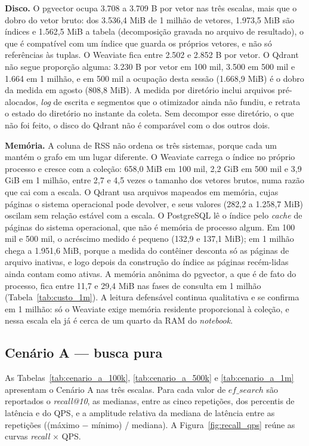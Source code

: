\textbf{Disco.} O pgvector ocupa 3.708 a 3.709 B por vetor nas três escalas, mais que o dobro do vetor bruto: dos 3.536,4 MiB de 1 milhão de vetores, 1.973,5 MiB são índices e 1.562,5 MiB a tabela (decomposição gravada no arquivo de resultado), o que é compatível com um índice que guarda os próprios vetores, e não só referências às tuplas. O Weaviate fica entre 2.502 e 2.852 B por vetor. O Qdrant não segue proporção alguma: 3.230 B por vetor em 100 mil, 3.500 em 500 mil e 1.664 em 1 milhão, e em 500 mil a ocupação desta sessão (1.668,9 MiB) é o dobro da medida em agosto (808,8 MiB). A medida por diretório inclui arquivos pré-alocados, \textit{log} de escrita e segmentos que o otimizador ainda não fundiu, e retrata o estado do diretório no instante da coleta. Sem decompor esse diretório, o que não foi feito, o disco do Qdrant não é comparável com o dos outros dois.

\textbf{Memória.} A coluna de RSS não ordena os três sistemas, porque cada um mantém o grafo em um lugar diferente. O Weaviate carrega o índice no próprio processo e cresce com a coleção: 658,0 MiB em 100 mil, 2,2 GiB em 500 mil e 3,9 GiB em 1 milhão, entre 2,7 e 4,5 vezes o tamanho dos vetores brutos, numa razão que cai com a escala. O Qdrant usa arquivos mapeados em memória, cujas páginas o sistema operacional pode devolver, e seus valores (282,2 a 1.258,7 MiB) oscilam sem relação estável com a escala. O PostgreSQL lê o índice pelo \textit{cache} de páginas do sistema operacional, que não é memória de processo algum. Em 100 mil e 500 mil, o acréscimo medido é pequeno (132,9 e 137,1 MiB); em 1 milhão chega a 1.951,6 MiB, porque a medida do contêiner desconta só as páginas de arquivo inativas, e logo depois da construção do índice as páginas recém-lidas ainda contam como ativas. A memória anônima do pgvector, a que é de fato do processo, fica entre 11,7 e 29,4 MiB nas fases de consulta em 1 milhão (Tabela~\ref{tab:custo_1m}). A leitura defensável continua qualitativa e se confirma em 1 milhão: só o Weaviate exige memória residente proporcional à coleção, e nessa escala ela já é cerca de um quarto da RAM do \textit{notebook}.

\subsection{Cenário A --- busca pura}

\label{sec:cenario_a}

As Tabelas~\ref{tab:cenario_a_100k}, \ref{tab:cenario_a_500k} e \ref{tab:cenario_a_1m} apresentam o Cenário A nas três escalas. Para cada valor de $ef\_search$ são reportados o \textit{recall@10}, as medianas, entre as cinco repetições, dos percentis de latência e do QPS, e a amplitude relativa da mediana de latência entre as repetições ((máximo $-$ mínimo) / mediana). A Figura~\ref{fig:recall_qps} reúne as curvas \textit{recall} $\times$ QPS.

